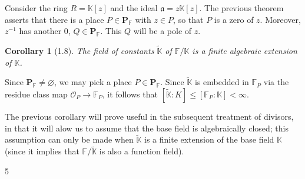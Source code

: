 \documentclass[11pt]{article}
\makeatletter
\theoremstyle{scplain}
\newtheorem*{corollary}{Corollary}
\renewenvironment{proof}[1][\proofname]{%
  \par\pushQED{\qed}\normalfont\topsep6\p@\@plus6\p@\relax
  \trivlist\item[\hskip\labelsep\scshape #1\@addpunct{.}]\ignorespaces}%
  {\popQED\endtrivlist\@endpefalse}
\makeatother
\begin{document}
\begin{proof}
Consider the ring $R = \mathbb{K}[z]$ and the ideal $\mathfrak{a} = z\mathbb{K}[z]$.
The previous theorem asserts that there is a place $P \in \mathbf{P}_{\mathbb{F}}$
with $z \in P$, so that $P$ is a zero of $z$. Moreover, $z^{-1}$ has another $0$,
$Q \in \mathbf{P}_{\mathbb{F}}$. This $Q$ will be a pole of $z$.
\end{proof}

\begin{corollary}[1.8]
The field of constants $\tilde{\mathbb{K}}$ of $\mathbb{F}/\mathbb{K}$ is a finite
algebraic extension of $\mathbb{K}$.
\end{corollary}

\begin{proof}
Since $\mathbf{P}_{\mathbb{F}} \neq \varnothing$, we may pick a place
$P \in \mathbf{P}_{\mathbb{F}}$. Since $\tilde{\mathbb{K}}$ is embedded in
$\mathbb{F}_P$ via the residue class map
$\mathcal{O}_P \longrightarrow \mathbb{F}_P$, it follows that
$[\tilde{\mathbb{K}} : K] \leq [\mathbb{F}_P : \mathbb{K}] < \infty$.
\end{proof}

The previous corollary will prove useful in the subsequent treatment of divisors,
in that it will alow us to assume that the base field is algebraically closed;
this assumption can only be made when $\tilde{\mathbb{K}}$ is a finite extension of
the base field $\mathbb{K}$ (since it implies that $\mathbb{F}/\tilde{\mathbb{K}}$
is also a function field).

\begin{center}5\end{center}
\end{document}
